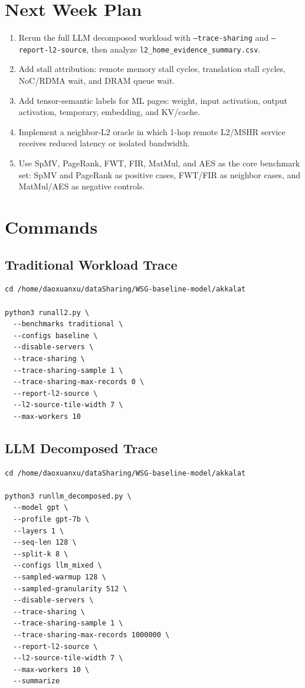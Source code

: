 \documentclass[sigconf,screen,review,anonymous]{acmart}
\begin{document}
\section{Next Week Plan}

\begin{enumerate}
  \item Rerun the full LLM decomposed workload with \texttt{--trace-sharing} and
  \texttt{--report-l2-source}, then analyze
  \texttt{l2\_home\_evidence\_summary.csv}.
  \item Add stall attribution: remote memory stall cycles, translation stall
  cycles, NoC/RDMA wait, and DRAM queue wait.
  \item Add tensor-semantic labels for ML pages: weight, input activation,
  output activation, temporary, embedding, and KV/cache.
  \item Implement a neighbor-L2 oracle in which 1-hop remote L2/MSHR service
  receives reduced latency or isolated bandwidth.
  \item Use SpMV, PageRank, FWT, FIR, MatMul, and AES as the core benchmark set:
  SpMV and PageRank as positive cases, FWT/FIR as neighbor cases, and
  MatMul/AES as negative controls.
\end{enumerate}

\section{Commands}

\subsection{Traditional Workload Trace}

\begin{verbatim}
cd /home/daoxuanxu/dataSharing/WSG-baseline-model/akkalat

python3 runall2.py \
  --benchmarks traditional \
  --configs baseline \
  --disable-servers \
  --trace-sharing \
  --trace-sharing-sample 1 \
  --trace-sharing-max-records 0 \
  --report-l2-source \
  --l2-source-tile-width 7 \
  --max-workers 10
\end{verbatim}

\subsection{LLM Decomposed Trace}

\begin{verbatim}
cd /home/daoxuanxu/dataSharing/WSG-baseline-model/akkalat

python3 runllm_decomposed.py \
  --model gpt \
  --profile gpt-7b \
  --layers 1 \
  --seq-len 128 \
  --split-k 8 \
  --configs llm_mixed \
  --sampled-warmup 128 \
  --sampled-granularity 512 \
  --disable-servers \
  --trace-sharing \
  --trace-sharing-sample 1 \
  --trace-sharing-max-records 1000000 \
  --report-l2-source \
  --l2-source-tile-width 7 \
  --max-workers 10 \
  --summarize
\end{verbatim}

\balance
\end{document}
